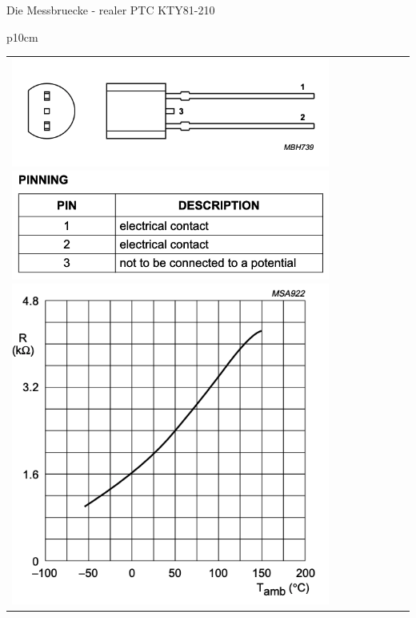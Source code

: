 \begin{frame}[t]{Die Messbruecke - realer PTC KTY81-210}
\begin{spacing}{0.9}
\begin{tiny}
\begin{table}[h!]
\begin{tabular}{p{10cm}}
\begin{minipage}{\textwidth}
            \begin{tabular}{p{3cm} p{8cm}}
                \begin{minipage}{.3\textwidth}
                    \includegraphics[width=0.8\linewidth]{pictures/kty81_overview.png}
                    \includegraphics[width=0.8\linewidth]{pictures/kty81_pinning.png}
                    \includegraphics[width=0.8\linewidth]{pictures/kty81_graph.png} 
                \end{minipage}
            & 
                \begin{minipage}{.7\textwidth}
                    \begin{figure}
                        \centering

\end{figure}
\end{minipage}
\end{tabular}
\end{minipage}
\end{tabular}
\end{table}
\end{tiny}
\end{spacing}
\end{frame}
